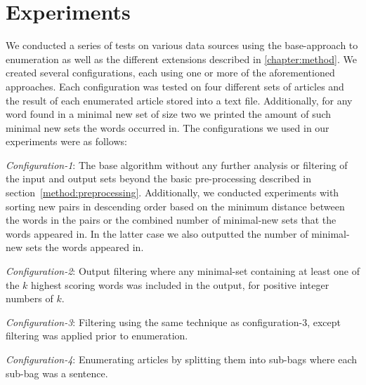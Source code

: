 \section{Experiments}
We conducted a series of tests on various data sources using the base-approach to enumeration as well as the different extensions described in \cref{chapter:method}. We created several configurations, each using one or more of the aforementioned approaches. Each configuration was tested on four different sets of articles and the result of each enumerated article stored into a text file. Additionally, for any word found in a minimal new set of size two we printed the amount of such minimal new sets the words occurred in. The configurations we used in our experiments were as follows:


\emph{Configuration-1}: The base algorithm without any further analysis or filtering of the input and output sets beyond the basic pre-processing described in section~\ref{method:preprocessing}. Additionally, we conducted experiments with sorting new pairs in descending order based on the minimum distance between the words in the pairs or the combined number of minimal-new sets that the words appeared in. In the latter case we also outputted the number of minimal-new sets the words appeared in.


\emph{Configuration-2}: Output filtering where any minimal-set containing at least one of the $k$ highest scoring words was included in the output, for positive integer numbers of $k$. 


\emph{Configuration-3}: Filtering using the same technique as configuration-3, except filtering was applied prior to enumeration.

\emph{Configuration-4}: Enumerating articles by splitting them into sub-bags where each sub-bag was a sentence.



